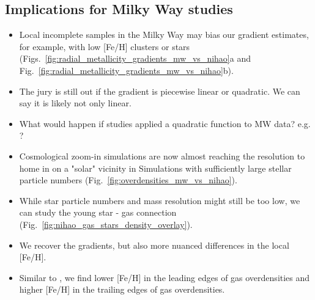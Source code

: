 \documentclass[fleqn,usenatbib]{mnras}
\begin{document}

\subsection{Implications for Milky Way studies}

\begin{itemize}
    \item Local incomplete samples in the Milky Way may bias our gradient estimates, for example, with low [Fe/H] clusters or stars (Figs.~\ref{fig:radial_metallicity_gradients_mw_vs_nihao}a and Fig.~\ref{fig:radial_metallicity_gradients_mw_vs_nihao}b).
    \item The jury is still out if the gradient is piecewise linear or quadratic. We can say it is likely not only linear.
    \item What would happen if studies applied a quadratic function to MW data? e.g. \citet{Yong2012, Andrievsky2004, Genovali2014}?
    \item Cosmological zoom-in simulations are now almost reaching the resolution to home in on a "solar" vicinity in Simulations with sufficiently large stellar particle numbers (Fig.~\ref{fig:overdensities_mw_vs_nihao}).
    \item While star particle numbers and mass resolution might still be too low, we can study the young star - gas connection (Fig.~\ref{fig:nihao_gas_stars_density_overlay}).
    \item We recover the gradients, but also more nuanced differences in the local [Fe/H].
    \item Similar to \citet{Grand2016}, we find lower [Fe/H] in the leading edges of gas overdensities and higher [Fe/H] in the trailing edges of gas overdensities.
\end{itemize}
\end{document}
